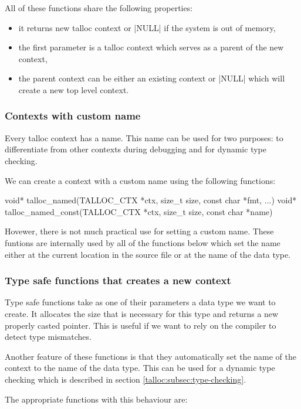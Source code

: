 All of these functions share the following properties:
\begin{itemize}
  \item it returns new talloc context or |NULL| if the system is out of memory,
  \item the first parameter is a talloc context which serves as a parent of
  the new context,
  \item the parent context can be either an existing context or |NULL| which
  will create a new top level context.
\end{itemize}

\subsubsection{Contexts with custom name}

Every talloc context has a name. This name can be used for two purposes: to
differentiate from other contexts during debugging and for dynamic type
checking.

We can create a context with a custom name using the following functions: 

\begin{funcproto}
void* talloc_named(TALLOC_CTX *ctx, size_t size,
                   const char *fmt, ...)
void* talloc_named_const(TALLOC_CTX *ctx, size_t size,
                         const char *name)
\end{funcproto}
\funclistend
Hovewer, there is not much practical use for setting a custom name. These
funtions are internally used by all of the functions below which set the name
either at the current location in the source file or at the name of the data
type.

\subsubsection{Type safe functions that creates a new context}

Type safe functions take as one of their parameters a data type we want to
create. It allocates the size that is necessary for this type and returns a new
properly casted pointer. This is useful if we want to rely on the compiler to
detect type mismatches.

Another feature of these functions is that they automatically set the name of
the context to the name of the data type. This can be used for a dynamic type
checking which is described in section \ref{talloc:subsec:type-checking}.

The appropriate functions with this behaviour are:

